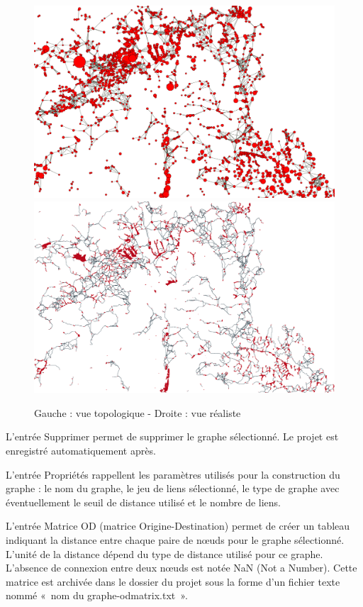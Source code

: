 \documentclass{article}
\begin{document}
\begin{figure}[H]
	\includegraphics[scale=0.1]{img/manual-fr_img17.png} 
	\includegraphics[scale=0.1]{img/manual-fr_img18.png} 
	\caption*{Gauche : vue topologique - Droite : vue réaliste}
\end{figure}


L'entrée Supprimer permet de supprimer le graphe sélectionné. Le projet est enregistré automatiquement après.

L'entrée Propriétés rappellent les paramètres utilisés pour la construction du graphe : le nom du graphe, le jeu de liens sélectionné, le type de graphe avec éventuellement le seuil de distance utilisé et le nombre de liens.

L'entrée Matrice OD (matrice Origine-Destination) permet de créer un tableau indiquant la distance entre chaque paire de nœuds pour le graphe sélectionné. L’unité de la distance dépend du type de distance utilisé pour ce graphe. L’absence de connexion entre deux nœuds est notée NaN (Not a Number). Cette  matrice est archivée dans le dossier du projet sous la forme d’un fichier texte nommé «~nom du graphe-odmatrix.txt~». 
\end{document}

